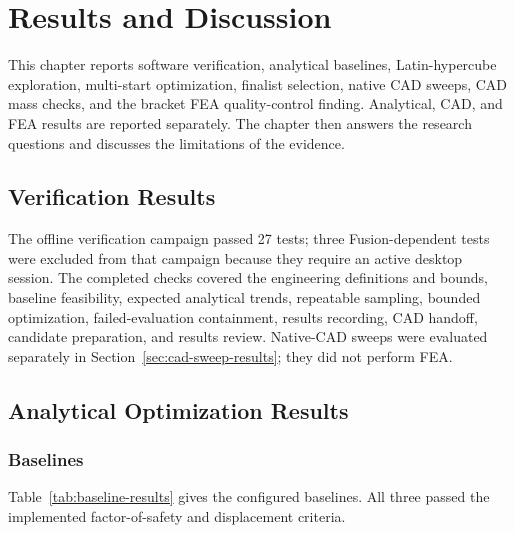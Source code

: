 \chapter{Results and Discussion}
\label{chap:results}

This chapter reports software verification, analytical baselines,
Latin-hypercube exploration, multi-start optimization, finalist selection,
native CAD sweeps, CAD mass checks, and the bracket FEA quality-control
finding. Analytical, CAD, and FEA results are reported separately. The chapter
then answers the research questions and discusses the limitations of the
evidence.

\section{Verification Results}
\label{sec:software-results}

The offline verification campaign passed 27 tests; three Fusion-dependent
tests were excluded from that campaign because they require an active desktop
session. The completed checks covered the engineering definitions and bounds,
baseline feasibility, expected analytical trends, repeatable sampling,
bounded optimization, failed-evaluation containment, results recording, CAD
handoff, candidate preparation, and results review. Native-CAD sweeps were
evaluated separately in Section~\ref{sec:cad-sweep-results}; they did not
perform FEA.

\section{Analytical Optimization Results}
\label{sec:analytical-results}

\subsection{Baselines}
\label{sec:baseline-results}

\screeningwarning

Table~\ref{tab:baseline-results} gives the configured baselines. All three
passed the implemented factor-of-safety and displacement criteria.

\begin{table}[H]
\centering
\caption{Analytical baseline screening results}
\label{tab:baseline-results}
\end{table}

